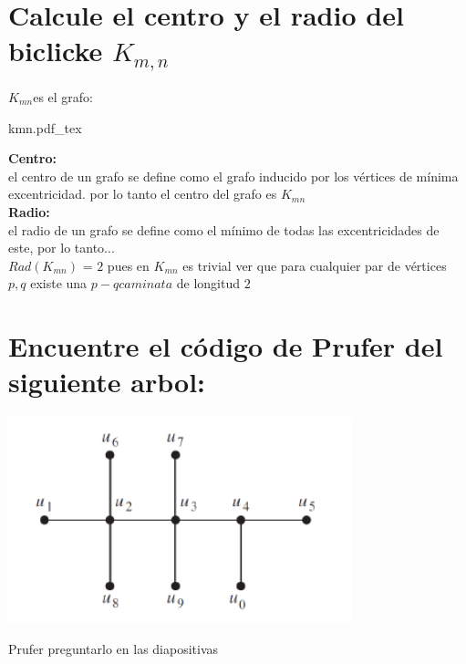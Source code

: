 \documentclass[10pt,a4paper]{article} %
\newcommand{\incfig}[1]{%
    \def\svgwidth{\columnwidth}
    {#1.pdf_tex}
}
\begin{document}


    \section{Calcule el centro y el radio del biclicke $K_{m,n}$}
        $K_{mn} $es el grafo:
            \begin{center}
            \incfig{kmn}%
            \end{center}

            \textbf{Centro:}
            \\
            el centro de un grafo se define como el grafo inducido por los
            vértices de mínima excentricidad. por lo tanto el centro del grafo es $K_{mn}$
            \\
            \textbf{Radio:}
            \\
            el radio de un grafo se define como el mínimo de todas las
            excentricidades de este, por lo tanto...
            \\
            $Rad(K_{mn} )$ = $2$ pues en $K_{mn}$ es trivial ver que para
            cualquier par de vértices $p,q$ existe una $p-q caminata$ de
            longitud $2$





    \section{Encuentre el código de Prufer del siguiente arbol:}
        \begin{center}
            \includegraphics[width=0.4\linewidth]{arbolp4}
        \end{center}
        \color{red} Prufer preguntarlo en las diapositivas  \color{black}



\end{document}
